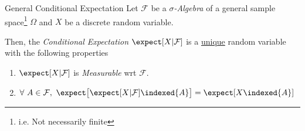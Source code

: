 \documentclass[11pt,a4paper]{article}
\begin{document}
  \begin{theorem}{General Conditional Expectation}\label{the_general_conditional_expectation}
    Let $\mathcal{F}$ be a \textit{$\sigma$-Algebra} of a general sample space\footnote{i.e. Not necessarily finite} $\Omega$ and $X$ be a discrete random variable.
    \par Then, the \textit{Conditional Expectation} $\expect[X|\mathcal{F}]$ is a \underline{unique} random variable with the following properties
    \begin{enumerate}
      \item $\expect[X|\mathcal{F}]$ is \textit{Measurable} wrt $\mathcal{F}$.
      \item $\forall\ A\in\mathcal{F},\ \expect\big[\expect[X|\mathcal{F}]\indexed\{A\}\big]=\expect[X\indexed\{A\}]$
    \end{enumerate}
  \end{theorem}
\end{document}
